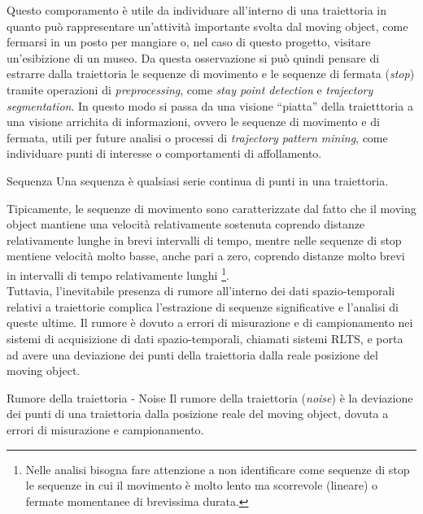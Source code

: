 \documentclass[12pt]{article}
\begin{document}
Questo comporamento è utile da individuare all'interno di una traiettoria in quanto può rappresentare un'attività importante svolta dal moving object, come fermarsi in un posto per mangiare o, nel caso di questo progetto, visitare un'esibizione di un museo.
Da questa osservazione si può quindi pensare di estrarre dalla traiettoria le sequenze di movimento e le sequenze di fermata (\emph{stop}) tramite operazioni di \emph{preprocessing}, come \emph{stay point detection} e \emph{trajectory segmentation}.
In questo modo si passa da una visione “piatta” della traietttoria a una visione arrichita di informazioni, ovvero le sequenze di movimento e di fermata, utili per future analisi o processi di \emph{trajectory pattern mining}, come individuare punti di interesse o comportamenti di affollamento.
\begin{definition}{Sequenza}{}
    Una sequenza è qualsiasi serie continua di punti in una traiettoria.
\end{definition}
Tipicamente, le sequenze di movimento sono caratterizzate dal fatto che il moving object mantiene una velocità relativamente sostenuta coprendo distanze relativamente lunghe in brevi intervalli di tempo, mentre nelle sequenze di stop mentiene velocità molto basse, anche pari a zero, coprendo distanze molto brevi in intervalli di tempo relativamente lunghi
\footnote{Nelle analisi bisogna fare attenzione a non identificare come sequenze di stop le sequenze in cui il movimento è molto lento ma scorrevole (lineare) o fermate momentanee di brevissima durata.}.\\
Tuttavia, l'inevitabile presenza di rumore all'interno dei dati spazio-temporali relativi a traiettorie complica l'estrazione di sequenze significative e l'analisi di queste ultime.
Il rumore è dovuto a errori di misurazione e di campionamento nei sistemi di acquisizione di dati spazio-temporali, chiamati sistemi RLTS, e porta ad avere una deviazione dei punti della traiettoria dalla reale posizione del moving object.
\begin{definition}{Rumore della traiettoria - Noise}{}
    Il rumore della traiettoria (\emph{noise}) è la deviazione dei punti di una traiettoria dalla posizione reale del moving object, dovuta a errori di misurazione e campionamento.
\end{definition}
\end{document}
